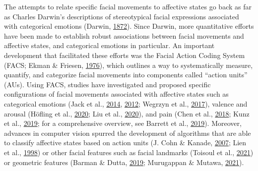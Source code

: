 \documentclass[12pt,american,a4paper,oneside,]{memoir} %
\begin{document}
The attempts to relate specific facial movements to affective states go back as far as Charles Darwin's descriptions of stereotypical facial expressions associated with categorical emotions (Darwin, \protect\hyperlink{ref-Darwin1872-nv}{1872}). Since Darwin, more quantitative efforts have been made to establish robust associations between facial movements and affective states, and categorical emotions in particular. An important development that facilitated these efforts was the Facial Action Coding System (FACS; Ekman \& Friesen, \protect\hyperlink{ref-Ekman1976-hm}{1976}), which outlines a way to systematically measure, quantify, and categorize facial movements into components called ``action units'' (AUs). Using FACS, studies have investigated and proposed specific configurations of facial movements associated with affective states such as categorical emotions (Jack et al., \protect\hyperlink{ref-Jack2014-ku}{2014}, \protect\hyperlink{ref-Jack2012-eq}{2012}; Wegrzyn et al., \protect\hyperlink{ref-Wegrzyn2017-ke}{2017}), valence and arousal (Höfling et al., \protect\hyperlink{ref-Hofling2020-mk}{2020}; Liu et al., \protect\hyperlink{ref-Liu2020-vo}{2020}), and pain (Chen et al., \protect\hyperlink{ref-chen2018distinct}{2018}; Kunz et al., \protect\hyperlink{ref-Kunz2019-uh}{2019}; for a comprehensive overview, see Barrett et al., \protect\hyperlink{ref-Barrett2019-bc}{2019}). Moreover, advances in computer vision spurred the development of algorithms that are able to classify affective states based on action units (J. Cohn \& Kanade, \protect\hyperlink{ref-Cohn2007-xe}{2007}; Lien et al., \protect\hyperlink{ref-Lien1998-bg}{1998}) or other facial features such as facial landmarks (Toisoul et al., \protect\hyperlink{ref-Toisoul2021-yc}{2021}) or geometric features (Barman \& Dutta, \protect\hyperlink{ref-Barman2019-af}{2019}; Murugappan \& Mutawa, \protect\hyperlink{ref-Murugappan2021-yj}{2021}).
\end{document}
